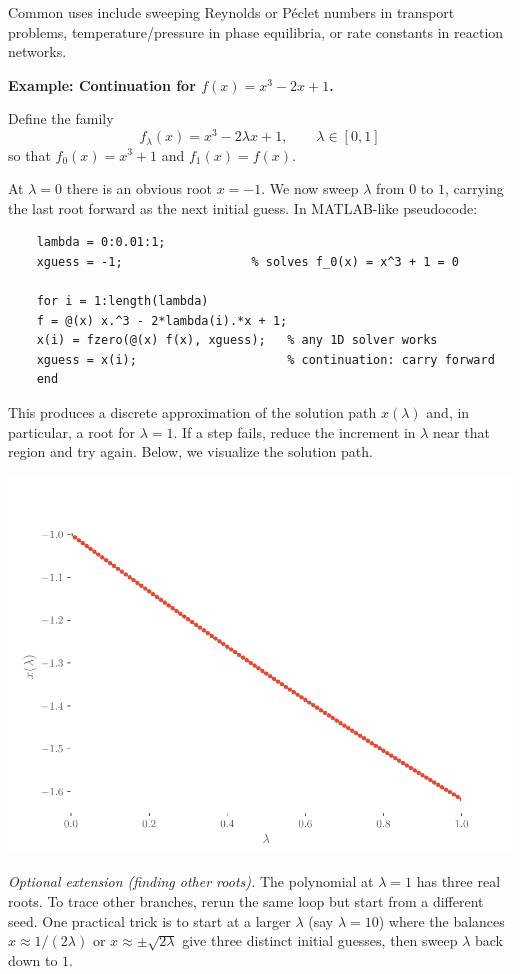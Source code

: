 Common uses include sweeping Reynolds or P\'eclet numbers in transport problems, temperature/pressure in phase equilibria, or rate constants in reaction networks.

\begin{exampleBox}
    \textbf{Example: Continuation for $f(x)=x^3-2x+1$.}
    
    Define the family
    $$
    f_{\lambda}(x)=x^3-2\lambda x+1,\qquad \lambda\in[0,1]
    $$
    so that $f_0(x)=x^3+1$ and $f_1(x)=f(x)$.
    
    At $\lambda=0$ there is an obvious root $x=-1$. We now sweep $\lambda$ from $0$ to $1$, carrying the last root forward as the next initial guess. In MATLAB-like pseudocode:
    
    \begin{verbatim}
    lambda = 0:0.01:1;
    xguess = -1;                  % solves f_0(x) = x^3 + 1 = 0
    
    for i = 1:length(lambda)
    f = @(x) x.^3 - 2*lambda(i).*x + 1;
    x(i) = fzero(@(x) f(x), xguess);   % any 1D solver works
    xguess = x(i);                     % continuation: carry forward
    end
    \end{verbatim}
    
    This produces a discrete approximation of the solution path $x(\lambda)$ and, in particular, a root for $\lambda=1$. If a step fails, reduce the increment in $\lambda$ near that region and try again. Below, we visualize the solution path.

    \begin{center}
        \includegraphics[width=.5\textwidth]{figs/nle/simple_continuation.pdf}
    \end{center}
    
    \emph{Optional extension (finding other roots).} The polynomial at $\lambda=1$ has three real roots. To trace other branches, rerun the same loop but start from a different seed. One practical trick is to start at a larger $\lambda$ (say $\lambda=10$) where the balances $x \approx 1/(2\lambda)$ or $x \approx \pm\sqrt{2\lambda}$ give three distinct initial guesses, then sweep $\lambda$ back down to $1$.
\end{exampleBox}

